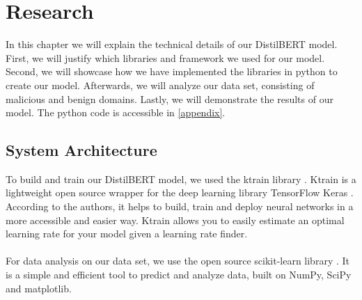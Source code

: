 \chapter{Research}\label{research}

In this chapter we will explain the technical details of our DistilBERT model. First, we will justify which libraries and framework we used for our model. Second, we will showcase how we have implemented the libraries in python to create our model. Afterwards, we will analyze our data set, consisting of malicious and benign domains. Lastly, we will demonstrate the results of our model. The python code is accessible in \ref{appendix}.

\section{System Architecture}
To build and train our DistilBERT model, we used the ktrain library \cite{maiya2020ktrain}. Ktrain is a lightweight open source wrapper for the deep learning library TensorFlow Keras \cite{chollet2015keras}. According to the authors, it helps to build, train and deploy neural networks in a more accessible and easier way. Ktrain allows you to easily estimate an optimal learning rate for your model given a learning rate finder.\\\\
For data analysis on our data set, we use the open source scikit-learn library \cite{sklearn_api}. It is a simple and efficient tool to predict and analyze data, built on NumPy, SciPy and matplotlib.


